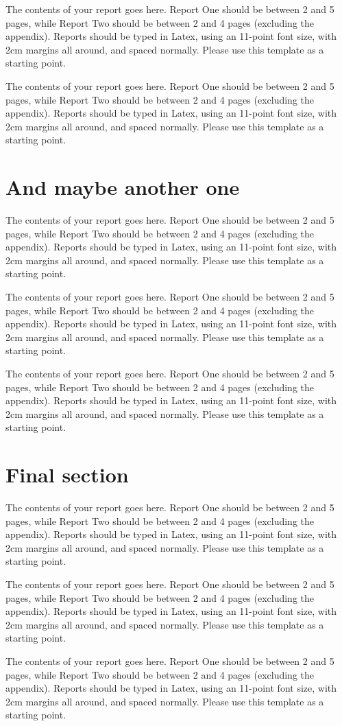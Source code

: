 \documentclass[a4paper,11pt]{article}
\begin{document}
The contents of your report goes here.  Report One should be between 2
and 5 pages, while Report Two should be between 2 and 4 pages
(excluding the appendix).  Reports should be typed in Latex, using an
11-point font size, with 2cm margins all around, and spaced normally.
Please use this template as a starting point.

The contents of your report goes here.  Report One should be between 2
and 5 pages, while Report Two should be between 2 and 4 pages
(excluding the appendix).  Reports should be typed in Latex, using an
11-point font size, with 2cm margins all around, and spaced normally.
Please use this template as a starting point.


\section{And maybe another one}

The contents of your report goes here.  Report One should be between 2
and 5 pages, while Report Two should be between 2 and 4 pages
(excluding the appendix).  Reports should be typed in Latex, using an
11-point font size, with 2cm margins all around, and spaced normally.
Please use this template as a starting point.

The contents of your report goes here.  Report One should be between 2
and 5 pages, while Report Two should be between 2 and 4 pages
(excluding the appendix).  Reports should be typed in Latex, using an
11-point font size, with 2cm margins all around, and spaced normally.
Please use this template as a starting point.

The contents of your report goes here.  Report One should be between 2
and 5 pages, while Report Two should be between 2 and 4 pages
(excluding the appendix).  Reports should be typed in Latex, using an
11-point font size, with 2cm margins all around, and spaced normally.
Please use this template as a starting point.


\section{Final section}

The contents of your report goes here.  Report One should be between 2
and 5 pages, while Report Two should be between 2 and 4 pages
(excluding the appendix).  Reports should be typed in Latex, using an
11-point font size, with 2cm margins all around, and spaced normally.
Please use this template as a starting point.

The contents of your report goes here.  Report One should be between 2
and 5 pages, while Report Two should be between 2 and 4 pages
(excluding the appendix).  Reports should be typed in Latex, using an
11-point font size, with 2cm margins all around, and spaced normally.
Please use this template as a starting point.

The contents of your report goes here.  Report One should be between 2
and 5 pages, while Report Two should be between 2 and 4 pages
(excluding the appendix).  Reports should be typed in Latex, using an
11-point font size, with 2cm margins all around, and spaced normally.
Please use this template as a starting point.

{}

\end{document}
